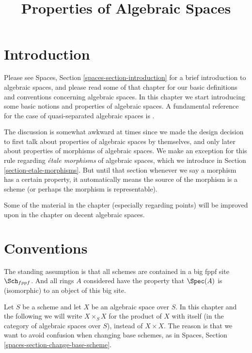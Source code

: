 

%


\title{Properties of Algebraic Spaces}


\maketitle

\label{section-phantom}

\tableofcontents

\section{Introduction}
\label{section-introduction}

\noindent
Please see
Spaces, Section \ref{spaces-section-introduction}
for a brief introduction to algebraic spaces, and please read
some of that chapter for our basic definitions and conventions
concerning algebraic spaces. In this chapter we start introducing
some basic notions and properties of algebraic spaces. A fundamental
reference for the case of quasi-separated algebraic spaces is
\cite{Kn}.

\medskip\noindent
The discussion is somewhat awkward at times since we made the design
decision to first talk about properties of algebraic spaces by
themselves, and only later about properties of morphisms of algebraic
spaces. We make an exception for this rule regarding
{\it \'etale morphisms} of algebraic spaces, which we introduce in
Section \ref{section-etale-morphisms}.
But until that section whenever we say a morphism has a certain property, it
automatically means the source of the morphism is a scheme (or perhaps the
morphism is representable).

\medskip\noindent
Some of the material in the chapter (especially regarding points)
will be improved upon in the chapter on decent algebraic spaces.


\section{Conventions}
\label{section-conventions}

\noindent
The standing assumption is that all schemes are contained in
a big fppf site $\Sch_{fppf}$. And all rings $A$ considered
have the property that $\Spec(A)$ is (isomorphic) to an
object of this big site.

\medskip\noindent
Let $S$ be a scheme and let $X$ be an algebraic space over $S$.
In this chapter and the following we will write $X \times_S X$
for the product of $X$ with itself (in the category of algebraic
spaces over $S$), instead of $X \times X$. The reason is that we
want to avoid confusion when changing base schemes, as in
Spaces, Section \ref{spaces-section-change-base-scheme}.


